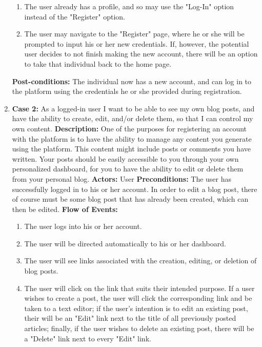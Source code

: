 \documentclass{article}
\begin{document}
\begin{enumerate}
\begin{enumerate}
        \item The user already has a profile, and so may use the "Log-In" option instead of the "Register" option.
        \item The user may navigate to the "Register" page, where he or she will be prompted to input his or her new credentials.  If, however, the potential user decides to not finish making the new account, there will be an option to take that individual back to the home page.
    \end{enumerate}
    \newline \textbf{Post-conditions: }The individual now has a new account, and can log in to the platform using the credentials he or she provided during registration.
    \item  \textbf{Case 2: }As a logged-in user I want to be able to see my own blog posts, and have the ability to create, edit, and/or delete them, so that I can control my own content. \newline
    \textbf{Description: }One of the purposes for registering an account with the platform is to have the ability to manage any content you generate using the platform.  This content might include posts or comments you have written.  Your posts should be easily accessible to you through your own personalized dashboard, for you to have the ability to edit or delete them from your personal blog. \newline
    \textbf{Actors: }User \newline
    \textbf{Preconditions: }The user has successfully logged in to his or her account.  In order to edit a blog post, there of course must be some blog post that has already been created, which can then be edited. \newline
    \textbf{Flow of Events: }
    \begin{enumerate}
        \item The user logs into his or her account.
        \item The user will be directed automatically to his or her dashboard.
        \item The user will see links associated with the creation, editing, or deletion of blog posts.
        \item The user will click on the link that suits their intended purpose.  If a user wishes to create a post, the user will click the corresponding link and be taken to a text editor; if the user's intention is to edit an existing post, their will be an "Edit" link next to the title of all previously posted articles; finally, if the user wishes to delete an existing post, there will be a "Delete" link next to every "Edit" link.

\end{enumerate}
\end{enumerate}
\end{document}
